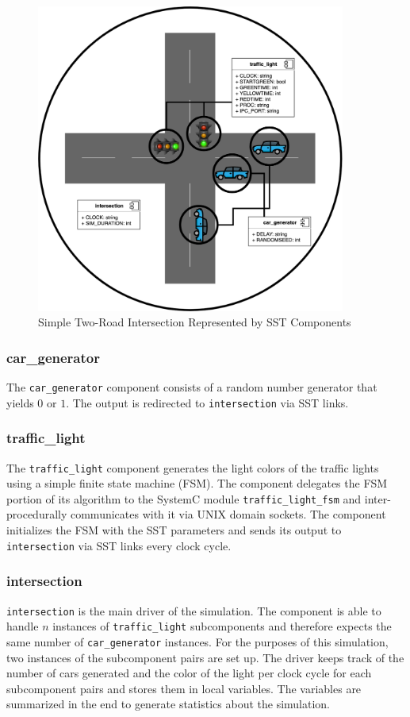 \documentclass{article}
\begin{document}
      \begin{figure}[!h]
        \centering
        \includegraphics[width=4in]{diagrams/intersection_comp.png}
        \caption{Simple Two-Road Intersection Represented by SST Components}
        \label{fig:intersection_comp}
      \end{figure}

      \subsubsection{car\_generator}
      The \lstinline{car_generator} component consists of a random number generator that yields $0$
      or $1$. The output is redirected to \lstinline{intersection} via SST links.

      \subsubsection{traffic\_light}
      The \lstinline{traffic_light} component generates the light colors of the traffic lights using
      a simple finite state machine (FSM). The component delegates the FSM portion of its algorithm
      to the SystemC module \lstinline{traffic_light_fsm} and inter-procedurally communicates with
      it via UNIX domain sockets. The component initializes the FSM with the SST parameters and
      sends its output to \lstinline{intersection} via SST links every clock cycle.

      \subsubsection{intersection}
      \lstinline{intersection} is the main driver of the simulation. The component is able to handle
      $n$ instances of \lstinline{traffic_light} subcomponents and therefore expects the same number
      of \lstinline{car_generator} instances. For the purposes of this simulation, two instances of
      the subcomponent pairs are set up. The driver keeps track of the number of cars generated and
      the color of the light per clock cycle for each subcomponent pairs and stores them in local
      variables. The variables are summarized in the end to generate statistics about the
      simulation.
\end{document}
